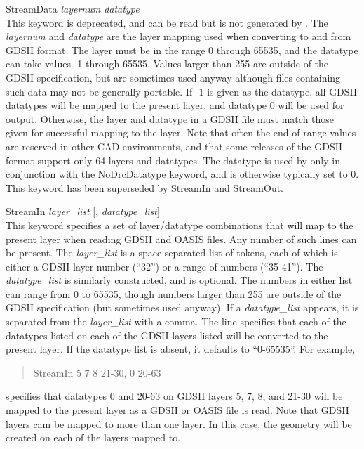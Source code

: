 \begin{description}
\item{\vt StreamData} {\it layernum datatype}\\
This keyword is deprecated, and can be read but is not generated by
{\Xic}.  The {\it layernum\/} and {\it datatype\/} are the layer
mapping used when converting to and from GDSII format.  The layer must
be in the range 0 through 65535, and the datatype can take values -1
through 65535.  Values larger than 255 are outside of the GDSII
specification, but are sometimes used anyway although files containing
such data may not be generally portable.  If -1 is given as the
datatype, all GDSII datatypes will be mapped to the present {\Xic}
layer, and datatype 0 will be used for output.  Otherwise, the layer
and datatype in a GDSII file must match those given for successful
mapping to the {\Xic} layer.  Note that often the end of range values
are reserved in other CAD environments, and that some releases of the
GDSII format support only 64 layers and datatypes.  The datatype is
used by {\Xic} only in conjunction with the {\vt NoDrcDatatype}
keyword, and is otherwise typically set to 0.  This keyword has been
superseded by {\vt StreamIn} and {\vt StreamOut}.

\item{\et StreamIn {\it layer\_list\/} [, {\it datatype\_list\/}]}\\
This keyword specifies a set of layer/datatype combinations that will
map to the present {\Xic} layer when reading GDSII and OASIS files. 
Any number of such lines can be present.  The {\it layer\_list\/} is a
space-separated list of tokens, each of which is either a GDSII layer
number (``32'') or a range of numbers (``35-41'').  The {\it
datatype\_list\/} is similarly constructed, and is optional.  The
numbers in either list can range from 0 to 65535, though numbers
larger than 255 are outside of the GDSII specification (but sometimes
used anyway).  If a {\it datatype\_list} appears, it is separated from
the {\it layer\_list} with a comma.  The line specifies that each of
the datatypes listed on each of the GDSII layers listed will be
converted to the present {\Xic} layer.  If the datatype list is
absent, it defaults to ``0-65535''.  For example,
\begin{quote}\vt
    StreamIn 5 7 8 21-30, 0 20-63
\end{quote}
specifies that datatypes 0 and 20-63 on GDSII layers 5, 7, 8, and
21-30 will be mapped to the present {\Xic} layer as a GDSII or OASIS
file is read.  Note that GDSII layers cam be mapped to more than one
{\Xic} layer.  In this case, the geometry will be created on each of
the {\Xic} layers mapped to.


\end{description}
